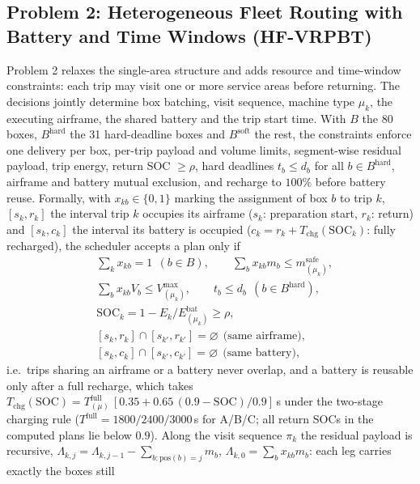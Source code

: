 \documentclass[journal]{IEEEtran}
\begin{document}
\subsection{Problem 2: Heterogeneous Fleet Routing with Battery and Time Windows (HF-VRPBT)}
Problem 2 relaxes the single-area structure and adds resource and time-window
constraints: each trip may visit one or more service areas before returning.
The decisions jointly determine box batching, visit sequence, machine type
$\mu_k$, the executing airframe, the shared battery and the trip start time.
With $B$ the 80 boxes,
$B^{\mathrm{hard}}$ the 31 hard-deadline boxes and $B^{\mathrm{soft}}$ the rest,
the constraints enforce one delivery per box, per-trip payload and volume
limits, segment-wise residual payload, trip energy, return SOC $\ge\rho$, hard
deadlines $t_b\le d_b$ for all $b\in B^{\mathrm{hard}}$, airframe and battery
mutual exclusion, and recharge to $100\%$ before battery reuse. Formally, with
$x_{kb}\in\{0,1\}$ marking the assignment of box $b$ to trip $k$, $[s_k,r_k]$
the interval trip $k$ occupies its airframe ($s_k$: preparation start, $r_k$:
return) and $[s_k,c_k]$ the interval its battery is occupied
($c_k=r_k+T_{\mathrm{chg}}(\mathrm{SOC}_k)$: fully recharged), the scheduler
accepts a plan only if
\begin{equation}
\begin{aligned}
&\textstyle\sum_{k}x_{kb}=1\ \ (b\in B),\qquad
\sum_{b}x_{kb}m_{b}\le m^{\mathrm{safe}}_{(\mu_k)},\\
&\textstyle\sum_{b}x_{kb}V_{b}\le V^{\max}_{(\mu_k)},\qquad
t_{b}\le d_{b}\ \ (b\in B^{\mathrm{hard}}),\\
&\mathrm{SOC}_{k}=1-E_{k}/E^{\mathrm{bat}}_{(\mu_k)}\ge\rho,\\
&[s_k,r_k]\cap[s_{k'},r_{k'}]=\varnothing\ \ \text{(same airframe),}\\
&[s_k,c_k]\cap[s_{k'},c_{k'}]=\varnothing\ \ \text{(same battery),}
\end{aligned}
\end{equation}
i.e.\ trips sharing an airframe or a battery never overlap, and a battery is
reusable only after a full recharge, which takes
$T_{\mathrm{chg}}(\mathrm{SOC})=T^{\mathrm{full}}_{(\mu)}\,[0.35+0.65\,(0.9-\mathrm{SOC})/0.9]$\,s
under the two-stage charging rule ($T^{\mathrm{full}}=1800/2400/3000$\,s for
A/B/C; all return SOCs in the computed plans lie below $0.9$). Along the visit
sequence $\pi_k$ the residual payload is recursive,
$\Lambda_{k,j}=\Lambda_{k,j-1}-\sum_{b:\mathrm{pos}(b)=j}m_b$,
$\Lambda_{k,0}=\sum_b x_{kb}m_b$: each leg carries exactly the boxes still
\end{document}
